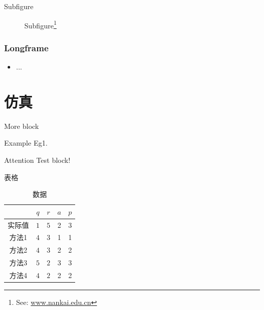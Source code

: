\documentclass[hyperref,UTF8,11pt]{beamer}
\begin{document}
\begin{frame}{Subfigure}
    \begin{figure}
        \centering
        \caption{Subfigure\footnote{See: \url{www.nankai.edu.cn}}}\label{fig:rnn}
    \end{figure}
\end{frame}

\begin{frame}[allowframebreaks]
    \frametitle{Longframe}
    \begin{itemize}
        \item ...
    \end{itemize}
\end{frame}

\section{仿真}

\begin{frame}{More block}
    \begin{exampleblock}{Example}
    Eg1.
    \end{exampleblock}
    \begin{alertblock}{Attention}
        Test block!
    \end{alertblock}
\end{frame}

\begin{frame}{表格}
    \begin{table}[]
        \centering
        \caption{数据}
        \label{tab1}
        \begin{tabular}{@{}ccccc@{}}
        \toprule
                    & $q$         & $r$         & $a$ & $p$           \\ \midrule
        实际值         & $1$  & $5$  & 2   & 3  \\
        方法1          & $4$ & $3$ & 1 & 1\\
        方法2        & $4$ & $3$ & 2 & 2\\
        方法3 & $5$ & $2$ & 3 & 3\\
        方法4          & $4$ & $2$ & 2 & 2\\ \bottomrule
        \end{tabular}
    \end{table}
\end{frame}
\end{document}
